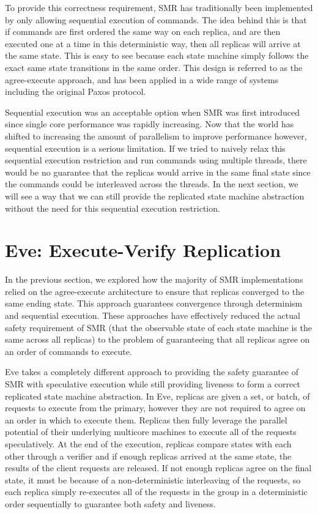 \documentclass[11pt, oneside]{report}
\begin{document}
To provide this correctness requirement, SMR has traditionally been implemented by only allowing sequential execution of commands. The idea behind this is that if commands are first ordered the same way on each replica, and are then executed one at a time in this deterministic way, then all replicas will arrive at the same state. This is easy to see because each state machine simply follows the exact same state transitions in the same order. This design is referred to as the agree-execute approach, and has been applied in a wide range of systems including the original Paxos protocol.

Sequential execution was an acceptable option when SMR was first introduced since single core performance was rapidly increasing. Now that the world has shifted to increasing the amount of parallelism to improve performance however, sequential execution is a serious limitation. If we tried to naively relax this sequential execution restriction and run commands using multiple threads, there would be no guarantee that the replicas would arrive in the same final state since the commands could be interleaved across the threads. In the next section, we will see a way that we can still provide the replicated state machine abstraction without the need for this sequential execution restriction.  

\section{Eve: Execute-Verify Replication}

In the previous section, we explored how the majority of SMR implementations relied on the agree-execute architecture to ensure that replicas converged to the same ending state. This approach guarantees convergence through determinism and sequential execution. These approaches have effectively reduced the actual safety requirement of SMR (that the observable state of each state machine is the same across all replicas) to the problem of guaranteeing that all replicas agree on an order of commands to execute.

Eve takes a completely different approach to providing the safety guarantee of SMR with speculative execution while still providing liveness to form a correct replicated state machine abstraction. In Eve, replicas are given a set, or batch, of requests to execute from the primary, however they are not required to agree on an order in which to execute them. Replicas then fully leverage the parallel potential of their underlying multicore machines to execute all of the requests speculatively. At the end of the execution, replicas compare states with each other through a verifier and if enough replicas arrived at the same state, the results of the client requests are released. If not enough replicas agree on the final state, it must be because of a non-deterministic interleaving of the requests, so each replica simply re-executes all of the requests in the group in a deterministic order sequentially to guarantee both safety and liveness.
\end{document}
